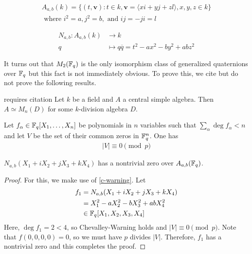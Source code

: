 \documentclass{amsart}
\begin{document}
\begin{defn}
\begin{gather*}
    A_{a,b}(k) = \{(t,\mathbf v): t \in k, \mathbf v = \langle xi + yj + zl \rangle, x,y,z \in k\} \\
    \text{ where } i^2 = a, j^2 = b, \text{ and } ij =-ji = l
\end{gather*}
\end{defn}

\begin{defn}
\begin{align*}
    N_{a,b}:  A_{a,b}(k) & \rightarrow k  \\
    q & \mapsto q \overline{q} = t^2 -ax^2 -by^2 +abz^2 
\end{align*}
\end{defn}

It turns out that $M_2(\protect\mathbb{F}_q)$ is the only isomorphism class of generalized quaternions over $\protect\mathbb{F}_q$ but this fact is not immediately obvious. To prove this, we cite but do not prove the following results. 

\begin{theorem}[Wedderburn]\label{wedderburn}
    {\color{blue} requires citation}
    Let $k$ be a field and $A$ a central simple algebra. Then $A \simeq M_n(D)$ for some $k$-division algebra $D$.
\end{theorem}

\begin{theorem}\label{c-warning}
    Let $f_{\alpha} \in \protect\mathbb{F}_q[X_1, \dots, X_n]$ be polynomials in $n$ variables such that $\sum_{\alpha} \deg f_{\alpha} < n$ and let $V$ be the set of their common zeros in $\protect\mathbb{F}_q^n$. One has 
    \begin{align*}
        | V | \equiv 0 \pmod{p}
    \end{align*}
\end{theorem}

\begin{lemma}\label{norm-nontrivial-zero}
    $N_{a,b}(X_1 + iX_2 + jX_3 + kX_4)$ has a nontrivial zero over $A_{a,b}(\protect\mathbb{F}_q)$.
\end{lemma}
\begin{proof}
    For this, we make use of \cref{c-warning}. Let 
    \begin{align*}
        f_1 &= N_{a,b}(X_1 + iX_2 + jX_3 + kX_4) \\
            &= X_1^2 -aX_2^2 -bX_3^2 + abX_4^2 \\
            &\in \protect\mathbb{F}_q[X_1, X_2, X_3, X_4]
    \end{align*}
    Here, $\deg f_1 = 2 < 4$, so Chevalley-Warning holds and $|V| \equiv 0 \pmod{p}$. Note that $f(0,0,0,0) = 0$, so we must have $p$ divides $|V|$. Therefore, $f_1$ has a nontrivial zero and this completes the proof.
\end{proof}
\end{document}
